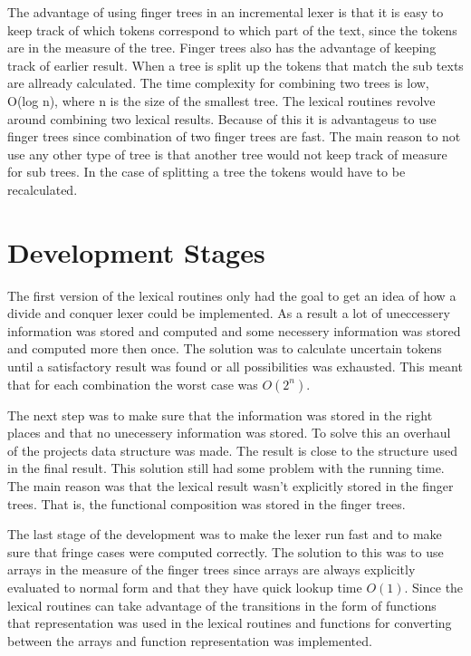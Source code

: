 The advantage of using finger trees in an incremental lexer is that it is easy
to keep track of which tokens correspond to which part of the text, since the
tokens are in the measure of the tree. Finger trees
also has the advantage of keeping track of earlier result. When a tree is split
up the tokens that match the sub texts are allready calculated. The time
complexity for combining two trees is low, O(log n), where n is the size of the
smallest tree. The lexical routines revolve around combining two lexical
results. Because of this it is advantageus to use finger trees since combination
of two finger trees are fast. The main reason to not use any other type of tree
is that another tree would not keep track of measure for sub trees. In the case
of splitting a tree the tokens would have to be recalculated.

\section{Development Stages}
The first version of the lexical routines only had the goal to get an idea of
how a divide and conquer lexer could be implemented. As a result a lot of
uneccessery information was stored and computed and some necessery information
was stored and computed more then once. The solution was to calculate
uncertain tokens until a satisfactory result was found or all possibilities was
exhausted. This meant that for each combination the worst case was $O(2^n)$.

The next step was to make sure that the information was stored in the right
places and that no unecessery information was stored. To solve this an overhaul
of the projects data structure was made. The result is close to the structure
used in the final result. This solution still had some problem with the running
time. The main reason was that the lexical result wasn't explicitly stored in
the finger trees. That is, the functional composition was stored in the finger
trees.

The last stage of the development was to make the lexer run fast and to make
sure that fringe cases were computed correctly. The solution to this was to use
arrays in the measure of the finger trees since arrays are always explicitly
evaluated to normal form and that they have quick lookup time $O(1)$. Since the
lexical routines can take advantage of the transitions in the form of functions
that representation was used in the lexical routines and functions for
converting between the arrays and function representation was implemented.

